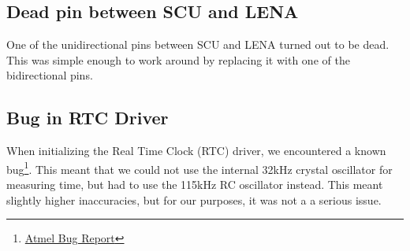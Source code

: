 \subsection{Dead pin between SCU and LENA}
One of the unidirectional pins between SCU and LENA turned out to be dead.
This was simple enough to work around by replacing it with one of the
bidirectional pins.

\subsection{Bug in RTC Driver}
When initializing the Real Time Clock (RTC) driver, we encountered a
known
bug\footnote{\href{http://asf.atmel.com/bugzilla/show_bug.cgi?id=10}{Atmel
Bug Report}}. This meant that we could not use the internal 32kHz
crystal oscillator for measuring time, but had to use the 115kHz RC
oscillator instead. This meant slightly higher inaccuracies, but for our
purposes, it was not a a serious issue.
